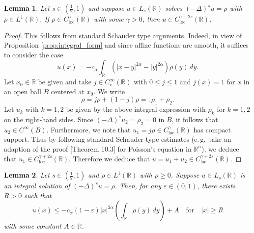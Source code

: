 \documentclass[reqno,10pt,a4paper]{amsart}
\newtheorem{lem}{Lemma}[section]
\theoremstyle{definition}
\theoremstyle{definition}
\theoremstyle{remark}
\theoremstyle{remark}
\numberwithin{equation}{section}
\newcommand{\R}{\mathbb{R}}
\newcommand{\eps}{\varepsilon}
\newcommand{\Ds}{(-\Delta)^{s}}
\newcommand{\Cloc}{C_{\mathrm{loc}}}
\begin{document}
\begin{lem} \label{lem:regularity}
Let $s \in (\frac 1 2, 1)$ and suppose $u \in L_s(\R)$ solves $\Ds u = \rho$ with $\rho \in L^1(\R)$. If $\rho \in \Cloc^\gamma(\R)$ with some $\gamma > 0$, then $u \in \Cloc^{\gamma+2s}(\R)$.
\end{lem}

\begin{proof}
This follows from standard Schauder type arguments. Indeed, in view of Proposition \ref{prop:integral_form} and since affine functions are smooth, it suffices to consider the case
$$
u(x) = -c_\alpha \int_\R (|x-y|^{2 \alpha}-|y|^{2 \alpha}) \rho(y) \, dy.
$$
Let $x_0 \in \R$ be given and take $j \in C^\infty_c(\R)$ with $0 \leq j \leq 1$ and $j(x) = 1$ for $x$ in an open ball $B$ centered at $x_0$. We write
$$
\rho = j \rho + (1-j) \rho =: \rho_1 + \rho_2 .
$$
Let $u_k$ with $k=1,2$ be given by the above integral expression with $\rho_k$ for $k=1,2$ on the right-hand sides. Since $\Ds u_2 = \rho_2 = 0$ in $B$, it follows that $u_2 \in C^\infty(B)$. Furthermore, we note that $u_1 = j \rho \in \Cloc^\gamma(\R)$ has compact support. Thus by following standard Schauder-type estimates (e.\,g.~take an adaption of the proof \cite{LiLo-01}[Theorem 10.3] for Poisson's equation in $\R^n$), we deduce that $u_1 \in \Cloc^{\gamma+2s}(\R)$. Therefore we deduce that $u=u_1+u_2 \in \Cloc^{\gamma+2s}(\R)$.
\end{proof}

\begin{lem} \label{lem:decay}
Let $s \in (\frac 1 2, 1)$ and $\rho \in L^1(\R)$ with $\rho \geq 0$. Suppose $u \in L_s(\R)$ is an integral solution of $\Ds u = \rho$. Then, for any $\eps \in (0,1)$, there exists $R > 0$ such that
$$
u(x) \leq -c_\alpha (1-\eps) |x|^{2 \alpha} \left ( \int_\R \rho(y) \, dy \right ) + A \quad \mbox{for} \quad  |x| \geq R
$$
with some constant $A \in \R$.
\end{lem}
\end{document}

